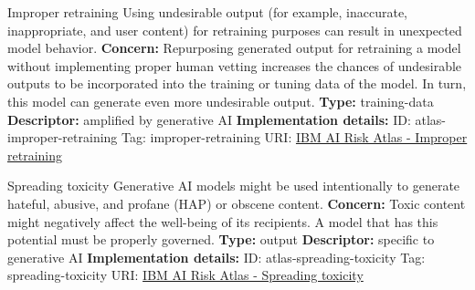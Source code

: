 \begin{definitionbox}{Improper retraining}
Using undesirable output (for example, inaccurate, inappropriate, and user content) for retraining purposes can result in unexpected model behavior.\newline\newline
\textbf{Concern: }Repurposing generated output for retraining a model without implementing proper human vetting increases the chances of undesirable outputs to be incorporated into the training or tuning data of the model. In turn, this model can generate even more undesirable output.\newline\newline
\textbf{Type: }training-data\newline
\textbf{Descriptor: }amplified by generative AI \newline\newline
\textbf{Implementation details: } \newline
ID: atlas-improper-retraining \newline
Tag: improper-retraining \newline
URI:  \href{https://www.ibm.com/docs/en/watsonx/saas?topic=SSYOK8/wsj/ai-risk-atlas/improper-retraining.html}{IBM AI Risk Atlas - Improper retraining}\newline
\end{definitionbox}
\begin{definitionbox}{Spreading toxicity}
Generative AI models might be used intentionally to generate hateful, abusive, and profane (HAP) or obscene content.\newline\newline
\textbf{Concern: }Toxic content might negatively affect the well-being of its recipients. A model that has this potential must be properly governed.\newline\newline
\textbf{Type: }output\newline
\textbf{Descriptor: }specific to generative AI \newline\newline
\textbf{Implementation details: } \newline
ID: atlas-spreading-toxicity \newline
Tag: spreading-toxicity \newline
URI:  \href{https://www.ibm.com/docs/en/watsonx/saas?topic=SSYOK8/wsj/ai-risk-atlas/spreading-toxicity.html}{IBM AI Risk Atlas - Spreading toxicity}\newline
\end{definitionbox}
